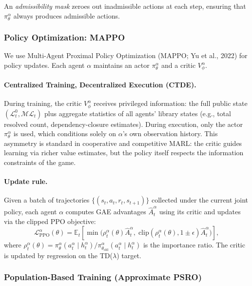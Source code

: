 An \emph{admissibility mask} zeroes out inadmissible actions at each step, ensuring that $\pi^\alpha_\theta$ always produces admissible actions.


\subsubsection{Policy Optimization: MAPPO}

We use Multi-Agent Proximal Policy Optimization (MAPPO; Yu et al., 2022) for policy updates. Each agent $\alpha$ maintains an actor $\pi^\alpha_\theta$ and a critic $V^\alpha_\phi$.

\paragraph{Centralized Training, Decentralized Execution (CTDE).}
During training, the critic $V^\alpha_\phi$ receives privileged information: the full public state $(\mathcal{L}^0_t, \mathcal{ML}_t)$ plus aggregate statistics of all agents' library states (e.g., total resolved count, dependency-closure estimates). During execution, only the actor $\pi^\alpha_\theta$ is used, which conditions solely on $\alpha$'s own observation history. This asymmetry is standard in cooperative and competitive MARL: the critic guides learning via richer value estimates, but the policy itself respects the information constraints of the game.

\paragraph{Update rule.}
Given a batch of trajectories $\{(s_t, a_t, r_t, s_{t+1})\}$ collected under the current joint policy, each agent $\alpha$ computes GAE advantages $\hat A^\alpha_t$ using its critic and updates via the clipped PPO objective:
\[
\mathcal{L}^{\alpha}_{\mathrm{PPO}}(\theta) = \mathbb{E}_t\!\left[\min\!\Big(\rho^\alpha_t(\theta)\hat A^\alpha_t,\;\mathrm{clip}(\rho^\alpha_t(\theta), 1\pm\epsilon)\hat A^\alpha_t\Big)\right],
\]
where $\rho^\alpha_t(\theta) = \pi^\alpha_\theta(a^\alpha_t\mid h^\alpha_t)/\pi^\alpha_{\theta_{\mathrm{old}}}(a^\alpha_t\mid h^\alpha_t)$ is the importance ratio. The critic is updated by regression on the TD($\lambda$) target.


\subsubsection{Population-Based Training (Approximate PSRO)}

